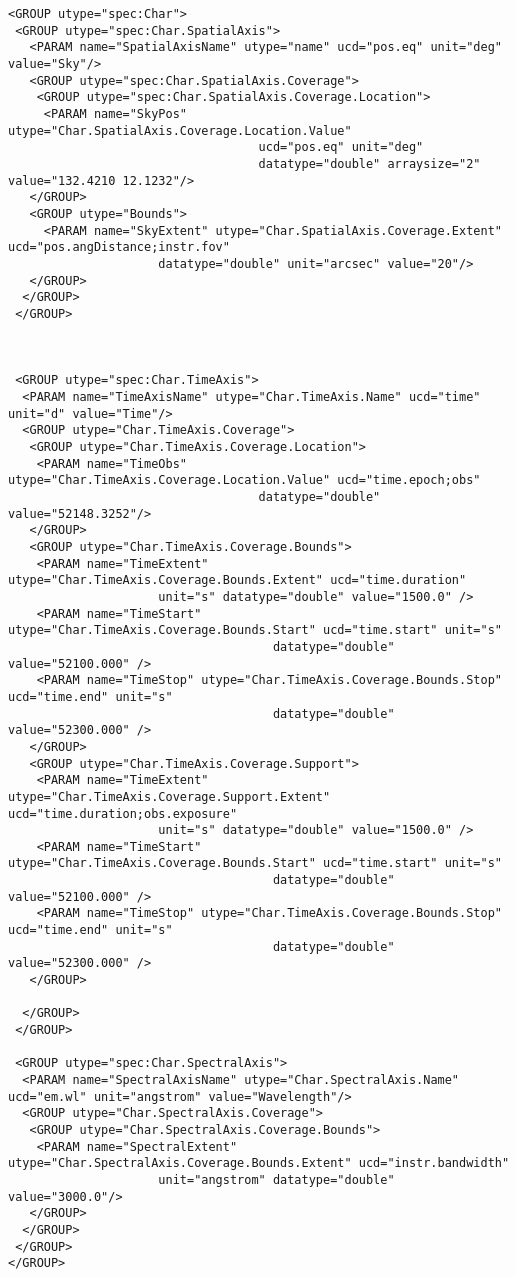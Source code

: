 {\begin{flushleft}
\begin{fmpage}
\begin{verbatim}
<GROUP utype="spec:Char">
 <GROUP utype="spec:Char.SpatialAxis">
   <PARAM name="SpatialAxisName" utype="name" ucd="pos.eq" unit="deg" value="Sky"/>
   <GROUP utype="spec:Char.SpatialAxis.Coverage">
    <GROUP utype="spec:Char.SpatialAxis.Coverage.Location">
     <PARAM name="SkyPos" utype="Char.SpatialAxis.Coverage.Location.Value" 
                                   ucd="pos.eq" unit="deg" 
                                   datatype="double" arraysize="2" value="132.4210 12.1232"/>
   </GROUP>
   <GROUP utype="Bounds">
     <PARAM name="SkyExtent" utype="Char.SpatialAxis.Coverage.Extent" ucd="pos.angDistance;instr.fov" 
                     datatype="double" unit="arcsec" value="20"/>
   </GROUP>
  </GROUP>
 </GROUP>



 <GROUP utype="spec:Char.TimeAxis">
  <PARAM name="TimeAxisName" utype="Char.TimeAxis.Name" ucd="time" unit="d" value="Time"/>
  <GROUP utype="Char.TimeAxis.Coverage">
   <GROUP utype="Char.TimeAxis.Coverage.Location">
    <PARAM name="TimeObs" utype="Char.TimeAxis.Coverage.Location.Value" ucd="time.epoch;obs"
                                   datatype="double" value="52148.3252"/>
   </GROUP>
   <GROUP utype="Char.TimeAxis.Coverage.Bounds">
    <PARAM name="TimeExtent" utype="Char.TimeAxis.Coverage.Bounds.Extent" ucd="time.duration"
                     unit="s" datatype="double" value="1500.0" />
    <PARAM name="TimeStart" utype="Char.TimeAxis.Coverage.Bounds.Start" ucd="time.start" unit="s" 
                                     datatype="double" value="52100.000" />
    <PARAM name="TimeStop" utype="Char.TimeAxis.Coverage.Bounds.Stop" ucd="time.end" unit="s" 
                                     datatype="double" value="52300.000" />
   </GROUP>
   <GROUP utype="Char.TimeAxis.Coverage.Support">
    <PARAM name="TimeExtent" utype="Char.TimeAxis.Coverage.Support.Extent" ucd="time.duration;obs.exposure"
                     unit="s" datatype="double" value="1500.0" />
    <PARAM name="TimeStart" utype="Char.TimeAxis.Coverage.Bounds.Start" ucd="time.start" unit="s" 
                                     datatype="double" value="52100.000" />
    <PARAM name="TimeStop" utype="Char.TimeAxis.Coverage.Bounds.Stop" ucd="time.end" unit="s" 
                                     datatype="double" value="52300.000" />
   </GROUP>

  </GROUP>
 </GROUP>

 <GROUP utype="spec:Char.SpectralAxis">
  <PARAM name="SpectralAxisName" utype="Char.SpectralAxis.Name" ucd="em.wl" unit="angstrom" value="Wavelength"/>
  <GROUP utype="Char.SpectralAxis.Coverage">
   <GROUP utype="Char.SpectralAxis.Coverage.Bounds">
    <PARAM name="SpectralExtent" utype="Char.SpectralAxis.Coverage.Bounds.Extent" ucd="instr.bandwidth" 
                     unit="angstrom" datatype="double" value="3000.0"/>
   </GROUP>
  </GROUP>
 </GROUP>
</GROUP>
\end{verbatim}
\end{fmpage}


\end{flushleft}}
